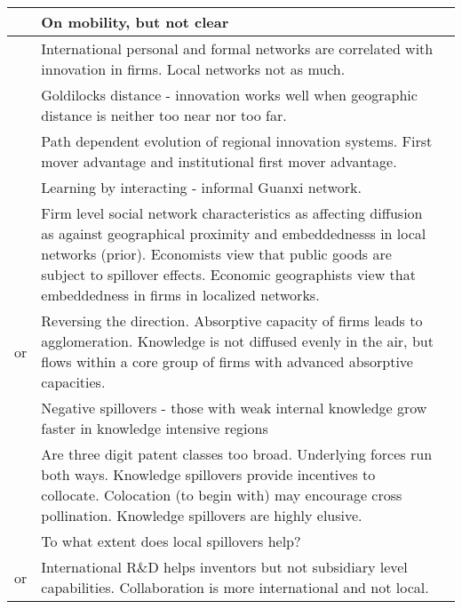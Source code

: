 \documentclass[12pt]{article}
\begin{document}
\begin{center}
\begin{longtable}{|p{}|p{}|p{}|}
\cite{Eriksson2011} & On mobility, but not clear&\\\hline

\cite{Fitjar2015} & International personal and formal networks are correlated with innovation in firms. Local networks not as much. &\\\hline

\cite{Fitjar2016} & Goldilocks distance - innovation works well when geographic distance is neither too near nor too far.&\\\hline

\cite{Fu2012} & Path dependent evolution of regional innovation systems. First mover advantage and institutional first mover advantage.&\\\hline

\cite{Fu2013} & Learning by interacting - informal Guanxi network.&\\\hline

\cite{Giuliani2007} & Firm level social network characteristics as affecting diffusion as against geographical proximity and embeddednesss in local networks (prior). Economists view that public goods are subject to spillover effects. Economic geographists view that embeddedness in firms in localized networks.&\\\hline

\cite{Giuliani2005b} or \cite{Giuliani2005a} & Reversing the direction. Absorptive capacity of firms leads to agglomeration.  Knowledge is not diffused evenly in the air, but flows within a core group of firms with advanced absorptive capacities.&\\\hline

\cite{Grillitsch2017} & Negative spillovers - those with weak internal knowledge  grow faster in knowledge intensive regions&\\\hline

\cite{Henderson2005} & Are three digit patent classes too broad. Underlying forces run both ways. Knowledge spillovers provide incentives to collocate. Colocation (to begin with) may encourage cross pollination. Knowledge spillovers are highly elusive.&\\\hline

\cite{Huber2011} & To what extent does local spillovers help?&\\\hline

\cite{Alnuaimi2012a} or \cite{Alnuaimi2012b}& International R\&D helps inventors but not subsidiary level capabilities. Collaboration is more international and not local.&\\\hline


\end{longtable}
\end{center}
\end{document}
